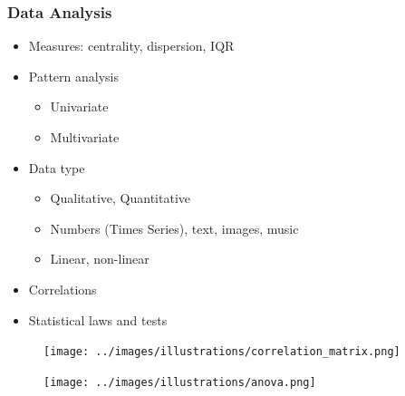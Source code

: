 \begin{frame}\frametitle{Data Analysis}
   \begin{itemize}
      \item Measures: centrality, dispersion, IQR
      \item Pattern analysis
      \begin{itemize}
         \item Univariate
         \item Multivariate
      \end{itemize}
      \item Data type
      \begin{itemize}
         \item Qualitative, Quantitative
         \item Numbers (Times Series), text, images, music
         \item Linear, non-linear
      \end{itemize}
      \item Correlations
      \item Statistical laws and tests
   \end{itemize}

   \vspace{.2cm}
   \begin{minipage}{0.38\linewidth}
      \begin{figure}[H]
         \texttt{[image: ../images/illustrations/correlation\_matrix.png]}
      \end{figure}
   \end{minipage}
   \begin{minipage}{0.58\linewidth}
      \begin{figure}[H]
         \texttt{[image: ../images/illustrations/anova.png]}
      \end{figure}
   \end{minipage}
\end{frame}


